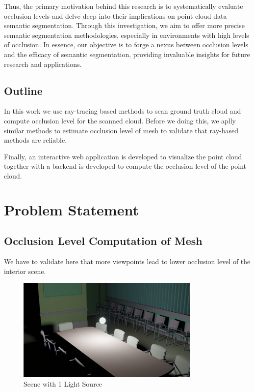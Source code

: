 \documentclass[11pt, a4paper,oneside,chapterprefix=false]{scrbook}
\begin{document}
Thus, the primary motivation behind this research is to systematically evaluate occlusion levels and delve deep into their implications on point cloud data semantic segmentation. Through this investigation, we aim to offer more precise semantic segmentation methodologies, especially in environments with high levels of occlusion. In essence, our objective is to forge a nexus between occlusion levels and the efficacy of semantic segmentation, providing invaluable insights for future research and applications.

\section{Outline} \label{sec:outline}

In this work we use ray-tracing based methods to scan ground truth cloud and compute occlusion level for the scanned cloud. Before we doing this, we aplly similar methods to estimate occlusion level of mesh to validate that ray-based methods are reliable.

Finally, an interactive web application is developed to visualize the point cloud together with a backend is developed to compute the occlusion level of the point cloud.


\chapter{Problem Statement} \label{chp:problem}



\section{Occlusion Level Computation of Mesh} \label{sec:occlusion}

We have to validate here that more viewpoints lead to lower occlusion level of the interior scene.

\noindent
\begin{minipage}{\textwidth}
	\begin{figure}[H]
		\centering
		\includegraphics*[width=0.8\textwidth]{figures/1 vp.png}
		\caption{Scene with 1 Light Source}
		\label{fig:scene with 1 light source}
	\end{figure}
\end{minipage}
\end{document}
